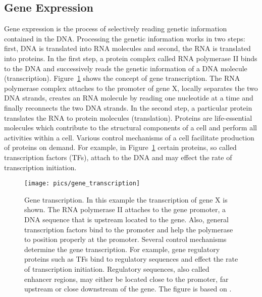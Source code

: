 \subsection{Gene Expression}
Gene expression is the process of selectively reading genetic information contained in the DNA.
Processing the genetic information works in two steps: first, DNA is translated into RNA molecules and second, the RNA is translated into proteins.
In the first step, a protein complex called RNA polymerase II binds to the DNA and successively reads the genetic information of a DNA molecule (transcription).
Figure~\ref{pic_gene_transciption} shows the concept of gene transcription.
The RNA polymerase complex attaches to the promoter of gene X, locally separates the two DNA strands, creates an RNA molecule by reading one nucleotide at a time and finally reconnects the two DNA strands.
In the second step, a particular protein translates the RNA to protein molecules (translation).
Proteins are life-essential molecules which contribute to the structural components of a cell and perform all activities within a cell.
Various control mechanisms of a cell facilitate production of proteins on demand.
For example, in Figure~\ref{pic_gene_transciption} certain proteins, so called transcription factors (TFs), attach to the DNA and may effect the rate of transcription initiation.

\begin{figure}[ht]
  \centering
  \texttt{[image: pics/gene\_transcription]}
\caption[Gene transcription]{Gene transcription. 
In this example the transcription of gene X is shown. 
The RNA polymerase II attaches to the gene promoter, a DNA sequence that is upstream located to the gene.
Also, general transcription factors bind to the promoter and help the polymerase to position properly at the promoter.
Several control mechanisms determine the gene transcription.
For example, gene regulatory proteins such as TFs bind to regulatory sequences and effect the rate of transcription initiation.
Regulatory sequences, also called enhancer regions, may either be located close to the promoter, far upstream or close downstream of the gene.
The figure is based on \cite{Alberts2002}.
}
\label{pic_gene_transciption}
\end{figure}

